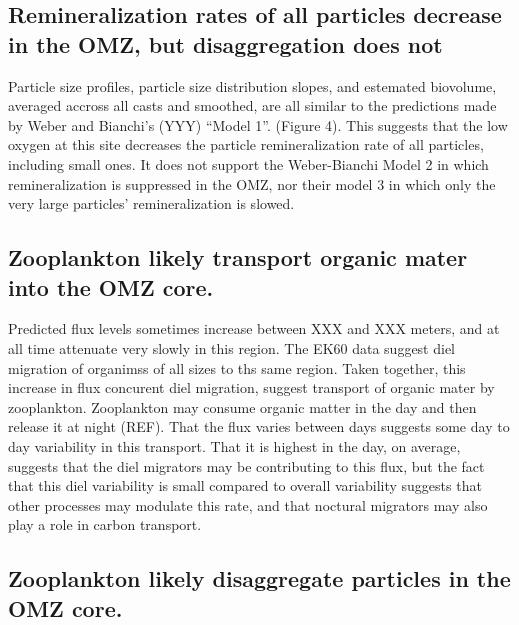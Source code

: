 \documentclass[]{article}
\begin{document}
\hypertarget{remineralization-rates-of-all-particles-decrease-in-the-omz-but-disaggregation-does-not}{%
\subsection{Remineralization rates of all particles decrease in the OMZ,
but disaggregation does
not}\label{remineralization-rates-of-all-particles-decrease-in-the-omz-but-disaggregation-does-not}}

Particle size profiles, particle size distribution slopes, and estemated
biovolume, averaged accross all casts and smoothed, are all similar to
the predictions made by Weber and Bianchi's (YYY) ``Model 1''. (Figure
4). This suggests that the low oxygen at this site decreases the
particle remineralization rate of all particles, including small ones.
It does not support the Weber-Bianchi Model 2 in which remineralization
is suppressed in the OMZ, nor their model 3 in which only the very large
particles' remineralization is slowed.

\hypertarget{zooplankton-likely-transport-organic-mater-into-the-omz-core.}{%
\subsection{Zooplankton likely transport organic mater into the OMZ
core.}\label{zooplankton-likely-transport-organic-mater-into-the-omz-core.}}

Predicted flux levels sometimes increase between XXX and XXX meters, and
at all time attenuate very slowly in this region. The EK60 data suggest
diel migration of organimss of all sizes to ths same region. Taken
together, this increase in flux concurent diel migration, suggest
transport of organic mater by zooplankton. Zooplankton may consume
organic matter in the day and then release it at night (REF). That the
flux varies between days suggests some day to day variability in this
transport. That it is highest in the day, on average, suggests that the
diel migrators may be contributing to this flux, but the fact that this
diel variability is small compared to overall variability suggests that
other processes may modulate this rate, and that noctural migrators may
also play a role in carbon transport.

\hypertarget{zooplankton-likely-disaggregate-particles-in-the-omz-core.}{%
\subsection{Zooplankton likely disaggregate particles in the OMZ
core.}\label{zooplankton-likely-disaggregate-particles-in-the-omz-core.}}
\end{document}
